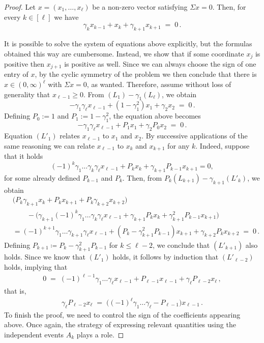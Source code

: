 \documentclass[10pt,a4paper]{amsart}
\begin{document}
\begin{proof}
Let $x=(x_1, \dots, x_\ell)$ be a non-zero vector satisfying $\Sigma x = 0$.
Then, for every $k \in [\ell]$ we have
\begin{equation}
\label{eq:eigen_0_Lk} \tag{$L_k$}
\gamma_{k} x_{k-1} + x_{k}+\gamma_{k+1} x_{k+1} \;=\;0\,.
\end{equation}

It is possible to solve the system of equations above explicitly, but the formulas obtained this way are cumbersome. Instead, we show that if some coordinate $x_j$ is positive then $x_{j+1}$ is positive as well. Since we can always choose the sign of one entry of $x$, by the cyclic symmetry of the problem we then conclude that there is $x \in (0,\infty)^{\ell}$ with $\Sigma x = 0$, as wanted.
Therefore, assume without loss of generality that $x_{\ell-1}\geq 0$. From
$(L_1)-\gamma_1(L_\ell)$, we obtain
\begin{equation*}
 -\gamma_1\gamma_\ell x_{\ell-1} +(1-\gamma_1^2)x_1+\gamma_2 x_2\;=\;0\,.
\end{equation*}
Defining $P_0 := 1$ and $P_1 := 1 - \gamma_1^2$, the equation above becomes
\begin{equation}
 -\gamma_1\gamma_\ell x_{\ell-1} +P_1 x_1+\gamma_2 P_0 x_2\;=\;0 \tag{$L'_1$}\,.
\end{equation}
Equation $(L'_1)$ relates $x_{\ell-1}$ to $x_1$ and $x_2$. By successive applications
of the same reasoning we can relate $x_{\ell-1}$ to $x_k$ and $x_{k+1}$ for any
$k$. Indeed, suppose that it holds
\begin{equation}
\tag{$L'_k$}
(-1)^k\gamma_1\dots\gamma_k\gamma_\ell x_{\ell-1}+P_k x_k+\gamma_{k+1}
    P_{k-1}x_{k+1}=0,
\end{equation}
for some already defined $P_{k-1}$ and $P_k$.
Then, from $P_k(L_{k+1})-\gamma_{k+1}(L'_k)$, we obtain
\begin{align*}
    &\bigl(P_k \gamma_{k+1} x_{k}
    + P_k x_{k+1}+P_k \gamma_{k+2} x_{k+2}\bigr) \\
    &\qquad - \bigl(\gamma_{k+1}(-1)^k\gamma_1\dots\gamma_{k}\gamma_\ell x_{\ell-1}
        + \gamma_{k+1} P_k x_k+\gamma_{k+1}^2 P_{k-1}x_{k+1}\bigr) \\
    &= (-1)^{k+1}\gamma_1\dots\gamma_{k+1}\gamma_\ell x_{\ell-1}+
    (P_k -\gamma_{k+1}^2 P_{k-1})x_{k+1}+\gamma_{k+2} P_{k}x_{k+2}
\;=\; 0\,.
\end{align*}
Defining $P_{k+1} \coloneqq P_k - \gamma_{k+1}^2 P_{k-1}$ for $k\leq \ell-2$, we conclude that $(L'_{k+1})$
also holds. Since we know that $(L'_1)$ holds, it follows by induction that
$(L'_{\ell-2})$ holds, implying that
\begin{align*}
0 \;=\; (-1)^{\ell-1}\gamma_1\dots\gamma_\ell x_{\ell-1}+
    P_{\ell-1} x_{\ell-1}+\gamma_{\ell} P_{\ell-2}x_{\ell}\,,
\end{align*}
that is,
\begin{align*}
\gamma_{\ell} P_{\ell-2}x_{\ell}
\;=\; \bigl((-1)^{\ell}\gamma_1\dots\gamma_\ell - P_{\ell-1}\bigr) x_{\ell-1}\,.
\end{align*}
To finish the proof, we need to control the sign of the coefficients appearing
above. Once again, the strategy of expressing relevant quantities using the
independent events $A_k$ plays a role.


\end{proof}
\end{document}
